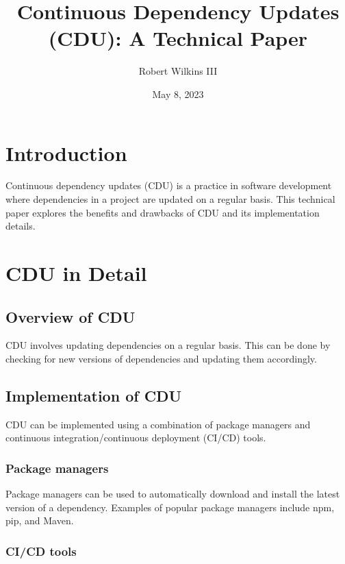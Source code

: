 \documentclass{article}
\begin{document}
\title{Continuous Dependency Updates (CDU): A Technical Paper}
\author{Robert Wilkins III}
\date{May 8, 2023}
\maketitle

\section{Introduction}
\label{sec:introduction}
Continuous dependency updates (CDU) is a practice in software development where dependencies in a project are updated on a regular basis. This technical paper explores the benefits and drawbacks of CDU and its implementation details.

\section{CDU in Detail}
\label{sec:cdu-in-detail}

\subsection{Overview of CDU}
\label{subsec:overview-of-cdu}

CDU involves updating dependencies on a regular basis. This can be done by checking for new versions of dependencies and updating them accordingly.

\subsection{Implementation of CDU}
\label{subsec:implementation-of-cdu}

CDU can be implemented using a combination of package managers and continuous integration/continuous deployment (CI/CD) tools.

\subsubsection{Package managers}
\label{subsubsec:package-managers}

Package managers can be used to automatically download and install the latest version of a dependency. Examples of popular package managers include npm, pip, and Maven.

\subsubsection{CI/CD tools}
\label{subsubsec:cicd-tools}
\end{document}
